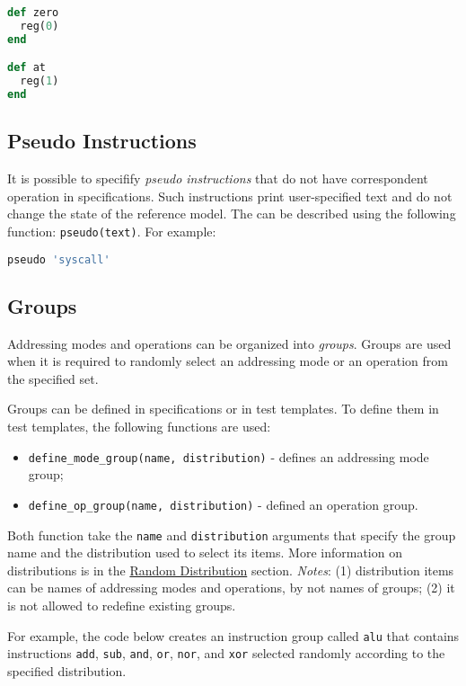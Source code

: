 \documentclass[oneside,final,12pt]{extreport}
\begin{document}
\begin{lstlisting}[language=ruby]
def zero
  reg(0)
end

def at
  reg(1)
end
\end{lstlisting}

\subsection{Pseudo Instructions}

It is possible to specifify \emph{pseudo instructions} that do not have correspondent
operation in specifications. Such instructions print user-specified text and do not
change the state of the reference model. The can be described using the following
function: \texttt{pseudo(text)}. For example:

\begin{lstlisting}[language=ruby]
pseudo 'syscall'
\end{lstlisting}

\subsection{Groups}

Addressing modes and operations can be organized into \emph{groups}. Groups are
used when it is required to randomly select an addressing mode or an operation
from the specified set.

Groups can be defined in specifications or in test templates. To define them in
test templates, the following functions are used: 

\begin{itemize}
\item \texttt{define{\_}mode{\_}group(name, distribution)} - defines an addressing mode\\group;
\item \texttt{define{\_}op{\_}group(name, distribution)} - defined an operation group.
\end{itemize}

Both function take the \texttt{name} and \texttt{distribution} arguments that specify
the group name and the distribution used to select its items.
More information on distributions is in the
\hyperref[Random_Distribution]{Random Distribution} section.
\emph{Notes}: (1) distribution items can be names of addressing modes and operations, by not
names of groups; (2) it is not allowed to redefine existing groups.

For example, the code below creates an instruction group called \texttt{alu} that contains
instructions \texttt{add}, \texttt{sub}, \texttt{and}, \texttt{or}, \texttt{nor}, and \texttt{xor}
selected randomly according to the specified distribution.
\end{document}
